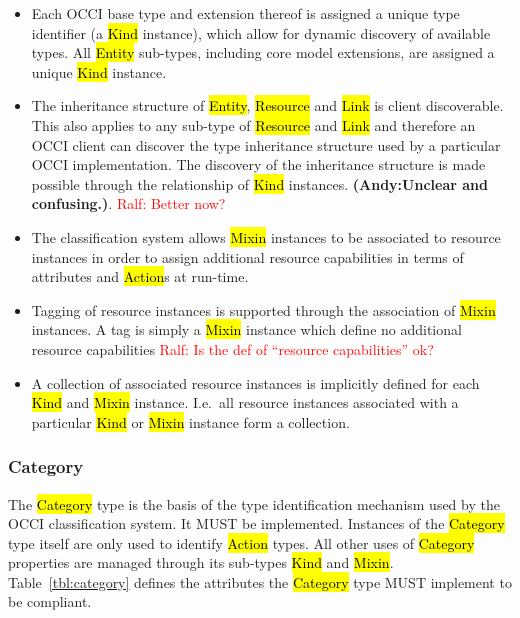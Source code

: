 \documentclass[10pt,a4paper]{article}
\newcommand{\ralf}[1]{\textcolor{red}{Ralf: #1}}
\begin{document}
\begin{itemize}
\item Each OCCI base type and extension thereof is assigned a unique type
 identifier (a \hl{Kind} instance), which allow for dynamic discovery of
 available types. All \hl{Entity} sub-types, including core model extensions, are assigned
 a unique \hl{Kind} instance.
\item The inheritance structure of \hl{Entity}, \hl{Resource} and \hl{Link} is
 client discoverable. This also applies to any sub-type of \hl{Resource} and
 \hl{Link} and therefore an OCCI client can discover the type inheritance structure
 used by a particular OCCI implementation. The discovery of the inheritance
 structure is made possible through the relationship of \hl{Kind} instances.
\textbf{(Andy:Unclear and confusing.)}.
\ralf{Better now?}
\item The classification system allows \hl{Mixin} instances to be associated
 to resource instances in order to assign additional resource capabilities in terms of
 attributes and \hl{Action}s at run-time.
\item Tagging of resource instances is supported through the association
 of \hl{Mixin} instances. A tag is simply a \hl{Mixin} instance which define no
 additional resource capabilities \ralf{Is the def of ``resource capabilities'' ok?}
\item A collection of associated resource instances is implicitly defined for
 each \hl{Kind} and \hl{Mixin} instance. I.e.~all resource instances associated
 with a particular \hl{Kind} or \hl{Mixin} instance form a collection.
\end{itemize}

\subsubsection{Category}
\label{sec:category}
The \hl{Category} type is the basis of the type
identification mechanism used by the
OCCI classification system. It MUST be implemented. Instances of the
\hl{Category} type itself are only used to identify \hl{Action} types. All
other uses of \hl{Category} properties are managed through its sub-types
\hl{Kind} and \hl{Mixin}.
%
Table~\ref{tbl:category} defines the attributes the \hl{Category} type MUST
implement to be compliant.

\end{document}
